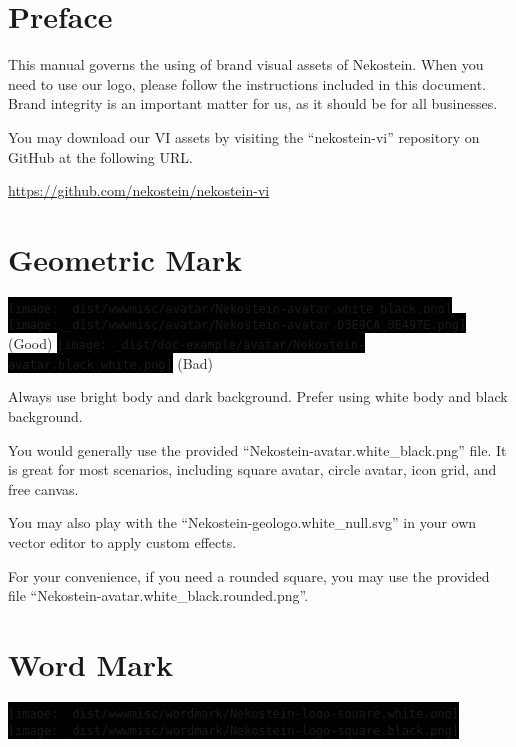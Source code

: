 \documentclass[a4paper,11pt]{report}
\newcommand{\altfbox}[1]{%
    \colorbox{black}{#1}%
}
\begin{document}
\sffamily

\tableofcontents\clearpage




\chapter{Preface}
This manual governs the using of brand visual assets of Nekostein.
When you need to use our logo, please follow the instructions included in this document.
Brand integrity is an important matter for us, as it should be for all businesses.

You may download our VI assets by visiting the ``nekostein-vi'' repository on GitHub at the following URL.

\begin{center}
    \href{https://github.com/nekostein/nekostein-vi}{https://github.com/nekostein/nekostein-vi}
\end{center}






\chapter{Geometric Mark}
\altfbox{\texttt{[image: \_dist/wwwmisc/avatar/Nekostein-avatar.white\_black.png]}}~~%
\altfbox{\texttt{[image: \_dist/wwwmisc/avatar/Nekostein-avatar.D3E9CA\_0E497E.png]}} (Good)
\hfill
\altfbox{\texttt{[image: \_dist/doc-example/avatar/Nekostein-avatar.black\_white.png]}} (Bad)

Always use bright body and dark background. Prefer using white body and black background.

You would generally use the provided ``Nekostein-avatar.white\_black.png'' file.
It is great for most scenarios, including square avatar, circle avatar, icon grid, and free canvas.

You may also play with the ``Nekostein-geologo.white\_null.svg'' in your own vector editor to apply custom effects.

For your convenience, if you need a rounded square, you may use the provided file ``Nekostein-avatar.white\_black.rounded.png''.





\chapter{Word Mark}
\altfbox{\texttt{[image: \_dist/wwwmisc/wordmark/Nekostein-logo-square.white.png]}}~~%
\altfbox{\texttt{[image: \_dist/wwwmisc/wordmark/Nekostein-logo-square.black.png]}}
\end{document}

